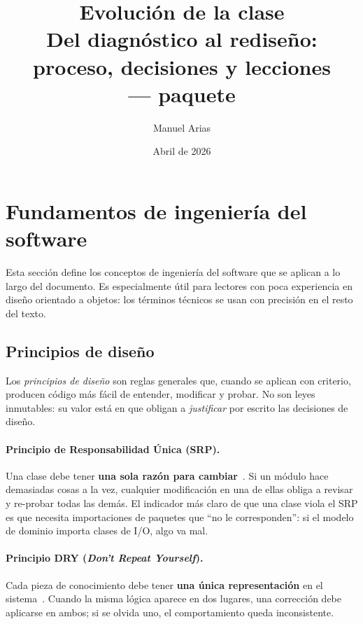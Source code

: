 \documentclass[11pt,a4paper]{article}
\title{Evolución de la clase \code{ProbNet}\\[4pt]
       \large Del diagnóstico al rediseño: proceso, decisiones y lecciones\\[4pt]
       \normalsize \code{org.openmarkov.core} --- paquete \code{model.network}}
\author{Manuel Arias}
\date{Abril de 2026}
\begin{document}
\maketitle
\tableofcontents
\newpage

\section{Fundamentos de ingeniería del software}
\label{sec:fundamentos}

Esta sección define los conceptos de ingeniería del software que se
aplican a lo largo del documento.  Es especialmente útil para lectores
con poca experiencia en diseño orientado a objetos: los términos técnicos
se usan con precisión en el resto del texto.

\subsection{Principios de diseño}
\label{sec:principios}

Los \emph{principios de diseño} son reglas generales que, cuando se
aplican con criterio, producen código más fácil de entender, modificar y
probar.  No son leyes inmutables: su valor está en que obligan a
\emph{justificar} por escrito las decisiones de diseño.

\paragraph{Principio de Responsabilidad Única (SRP).}
\label{sec:srp}
Una clase debe tener \textbf{una sola razón para cambiar}~\cite{martin2003}.
Si un módulo hace demasiadas cosas a la vez, cualquier modificación en una
de ellas obliga a revisar y re-probar todas las demás.  El indicador más
claro de que una clase viola el SRP es que necesita importaciones de
paquetes que ``no le corresponden'': si el modelo de dominio importa
clases de I/O, algo va mal.

\paragraph{Principio DRY (\emph{Don't Repeat Yourself}).}
\label{sec:dry}
Cada pieza de conocimiento debe tener \textbf{una única representación}
en el sistema~\cite{hunt1999}.  Cuando la misma lógica aparece en dos
lugares, una corrección debe aplicarse en ambos; si se olvida uno, el
comportamiento queda inconsistente.
\end{document}
